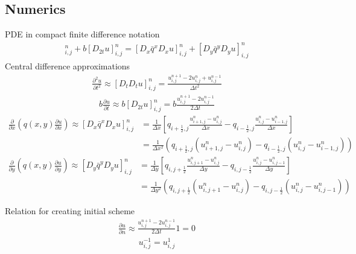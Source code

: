 \documentclass[11pt]{article}
\begin{document}
		\subsection{Numerics}
		PDE in compact finite difference notation
		\begin{align*}
		[D_tD_{t}u]^n_{i,j} + b[D_{2t}u]^n_{i,j} 
		= [D_{x}\bar{q}^{x} D_{x}u]^n_{i,j} 
		+ [D_{y}\bar{q}^{y} D_{y}u]^n_{i,j}
		\end{align*}
		Central difference approximations
		\begin{align*}
		\frac{\partial^2 u}{\partial t^2} 
		\approx [D_tD_{t}u]^n_{i,j}
		= \frac{u^{n+1}_{i,j} - 2u^{n}_{i,j}
		+ u^{n-1}_{i,j}}{\Delta t^2}
		\end{align*}
		\begin{align*}
		b\frac{\partial u}{\partial t}
		\approx b[D_{2t}u]^n_{i,j}
		= b\frac{u^{n+1}_{i,j} - 2u^{n-1}_{i,j}}
		{2\Delta t}
		\end{align*}
		\begin{align*}
		\frac{\partial}{\partial x} 
		\left(q(x,y)\frac{\partial u}{\partial x}
		\right)
		\approx [D_{x}\bar{q}^{x} D_{x}u]^n_{i,j} 
		 &=\frac{1}{\Delta x}
		\left[q_{i+\frac{1}{2},j}
		\frac{u^{n}_{i+1,j}-u^{n}_{i,j}}{\Delta x}
		-q_{i-\frac{1}{2},j}
		\frac{u^{n}_{i,j}-u^{n}_{i-1,j}}{\Delta x}\right] \\
		&= \frac{1}{\Delta x^2}\left(q_{i+\frac{1}{2},j}
		(u^{n}_{i+1,j}-u^{n}_{i,j})-q_{i-\frac{1}{2},j}(
		u^{n}_{i,j}-u^{n}_{i-1,j})\right)
		\end{align*}
		\begin{align*}
		\frac{\partial}{\partial y} 
		\left(q(x,y)\frac{\partial u}{\partial y}
		\right)
		\approx [D_{y}\bar{q}^{y} D_{y}u]^n_{i,j} 
		 &=\frac{1}{\Delta y}
		\left[q_{i,j+\frac{1}{2}}
		\frac{u^{n}_{i,j+1}-u^{n}_{i,j}}{\Delta y}
		-q_{i,j-\frac{1}{2}}
		\frac{u^{n}_{i,j}-u^{n}_{i,j-1}}{\Delta y}\right] \\
		&= \frac{1}{\Delta y^2}\left(q_{i,j+\frac{1}{2}}
		(u^{n}_{i,j+1}-u^{n}_{i,j})-q_{i,j-\frac{1}{2}}(
		u^{n}_{i,j}-u^{n}_{i,j-1})\right)
		\end{align*}
		
		Relation for creating initial scheme
		\begin{align*}
		\frac{\partial u}{\partial n} \approx \frac{u^{n+1}_{i,j} - 
		2u^{n-1}_{i,j}}{2\Delta t}1 = 0
		\end{align*}	
		\begin{align*}
		u^{-1}_{i,j} = u^{1}_{i,j} 
		\end{align*}				
		
\end{document}

